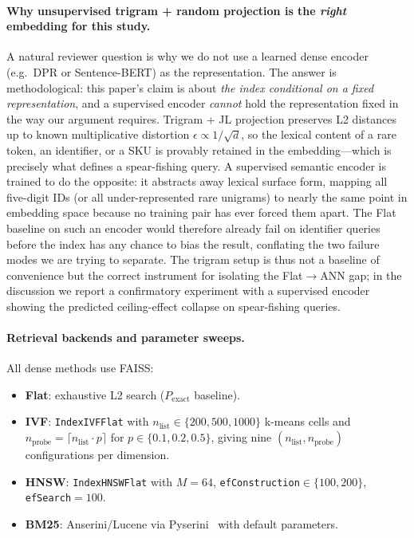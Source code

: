 \documentclass[conference]{IEEEtran}
\begin{document}
\paragraph{Why unsupervised trigram + random projection is the \emph{right} embedding for this study.}
A natural reviewer question is why we do not use a learned dense encoder (e.g.\ DPR or Sentence-BERT) as the representation. The answer is methodological: this paper's claim is about \emph{the index conditional on a fixed representation}, and a supervised encoder \emph{cannot} hold the representation fixed in the way our argument requires. Trigram + JL projection preserves L2 distances up to known multiplicative distortion $\epsilon\!\propto\!1/\sqrt{d}$, so the lexical content of a rare token, an identifier, or a SKU is provably retained in the embedding---which is precisely what defines a spear-fishing query. A supervised semantic encoder is trained to do the opposite: it abstracts away lexical surface form, mapping all five-digit IDs (or all under-represented rare unigrams) to nearly the same point in embedding space because no training pair has ever forced them apart. The Flat baseline on such an encoder would therefore already fail on identifier queries before the index has any chance to bias the result, conflating the two failure modes we are trying to separate. The trigram setup is thus not a baseline of convenience but the correct instrument for isolating the Flat$\to$ANN gap; in the discussion we report a confirmatory experiment with a supervised encoder showing the predicted ceiling-effect collapse on spear-fishing queries.

\paragraph{Retrieval backends and parameter sweeps.} All dense methods use FAISS:
\begin{itemize}
\item \textbf{Flat}: exhaustive L2 search ($P_{\text{exact}}$ baseline).
\item \textbf{IVF}: \texttt{IndexIVFFlat} with $n_{\text{list}}\in\{200,500,1000\}$ k-means cells and $n_{\text{probe}}=\lceil n_{\text{list}}\cdot p\rceil$ for $p\in\{0.1,0.2,0.5\}$, giving nine $(n_{\text{list}},n_{\text{probe}})$ configurations per dimension.
\item \textbf{HNSW}: \texttt{IndexHNSWFlat} with $M{=}64$, \texttt{efConstruction}$\in\{100,200\}$, \texttt{efSearch}$=100$.
\item \textbf{BM25}: Anserini/Lucene via Pyserini~\cite{lin2021pyserini} with default parameters.
\end{itemize}
\end{document}
